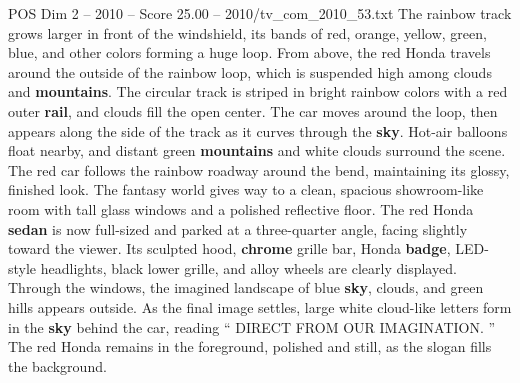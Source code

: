 \begin{textsample}{POS Dim 2 – 2010 – Score 25.00 – 2010/tv\_com\_2010\_53.txt}
The rainbow track grows larger in front of the windshield, its bands of red, orange, yellow, green, blue, and other colors forming a huge loop.
From above, the red Honda travels around the outside of the rainbow loop, which is suspended high among clouds and \textbf{mountains}.
The circular track is striped in bright rainbow colors with a red outer \textbf{rail}, and clouds fill the open center.
The car moves around the loop, then appears along the side of the track as it curves through the \textbf{sky}.
Hot-air balloons float nearby, and distant green \textbf{mountains} and white clouds surround the scene.
The red car follows the rainbow roadway around the bend, maintaining its glossy, finished look.
The fantasy world gives way to a clean, spacious showroom-like room with tall glass windows and a polished reflective floor.
The red Honda \textbf{sedan} is now full-sized and parked at a three-quarter angle, facing slightly toward the viewer.
Its sculpted hood, \textbf{chrome} grille bar, Honda \textbf{badge}, LED-style headlights, black lower grille, and alloy wheels are clearly displayed.
Through the windows, the imagined landscape of blue \textbf{sky}, clouds, and green hills appears outside.
As the final image settles, large white cloud-like letters form in the \textbf{sky} behind the car, reading “ DIRECT FROM OUR IMAGINATION. ” The red Honda remains in the foreground, polished and still, as the slogan fills the background.

\end{textsample}
